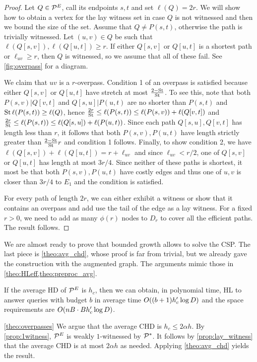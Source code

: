\begin{proof}
Let $Q\in\mathcal{P}^E$, call its endpoints $s,t$ and set $\ell(Q)=2r$.
We will show how to obtain a vertex for the lay witness set in case $Q$ is not witnessed and then we bound the size of the set.
Assume that $Q\neq P(s,t)$, otherwise the path is trivially witnessed.
Let $(u,v)\in Q$ be such that $\ell(Q[s,v]),\ell(Q[u,t])\geq r$. 
If either $Q[s,v]$ or $Q[u,t]$ is a shortest path or $\ell_{uv}\geq r$, then $Q$ is witnessed, so we assume that all of these fail.
See \cref{fig:overpass} for a diagram.

We claim that $uv$ is a $r$-overpass.
Condition 1 of an overpass is satisfied because either $Q[s,v]$ or $Q[u,t]$ have stretch at most $\frac{2-\operatorname{St}}{\operatorname{St}}$.
To see this, note that both $P(s,v)|Q[v,t]$ and $Q[s,u]|P(u,t)$ are no shorter than $P(s,t)$ and $\operatorname{St}\ell(P(s,t))\geq \ell(Q)$, hence
$\frac{2r}{\operatorname{St}}\leq \ell(P(s,t)) \leq  \ell(P(s,v)) + \ell(Q[v,t])$ and $\frac{2r}{\operatorname{St}} \leq \ell(P(s,t)) \leq  \ell(Q[s,u]) + \ell(P(u,t))$.
Since each path $Q[s,u],Q[v,t]$ has length less than $r$, it follows that both $P(s,v),P(u,t)$ have length strictly greater than $\frac{2-\operatorname{St}}{\operatorname{St}}r$ and condition 1 follows. 
Finally, to show condition 2, we have $\ell(Q[s,v])+\ell(Q[u,t])=r+\ell_{uv}$ and since $\ell_{uv}<r/2$, one of $Q[s,v]$ or $Q[u,t]$ has length at most $3r/4$.
Since neither of these paths is shortest, it most be that both $P(s,v),P(u,t)$ have costly edges and thus one of $u,v$ is closer than $3r/4$ to $E_1$ and the condition is satisfied.

For every path of length $2r$, we can either exhibit a witness or show that it contains an overpass and add use the tail of the edge as a lay witness.
For a fixed $r>0$, we need to add as many $\phi(r)$ nodes to $D_r$ to cover all the efficient paths. 
The result follows.
\end{proof}

We are almost ready to prove that bounded growth allows to solve the CSP.
The last piece is \cref{theo:avg_chd}, whose proof is far from trivial, but we already gave the construction with the augmented graph.
The arguments mimic those in \cref{theo:HLeff,theo:preproc_avg}.

\begin{theorem}\label{theo:avg_chd}
If the average HD of $\mathcal{P}^E$ is $h_c$, then we can obtain, in polynomial time, HL to answer queries with budget $b$ in average time $O((b+1)h_c'\log D)$ and the space requirements are $O(nB\cdot Bh_c'\log D)$.
\end{theorem}

\begin{proofof}{\cref{theo:overpasses}}
We argue that the average CHD is $h_c\leq 2\alpha h$.
By \cref{prop:1witness}, $\mathcal{P}^E$ is weakly $1$-witnessed by $\mathcal{P}^*$.
It follows by \cref{prop:lay_witness} that the average CHD is at most $2\alpha h$ as needed.
Applying \cref{theo:avg_chd} yields the result.
\end{proofof}